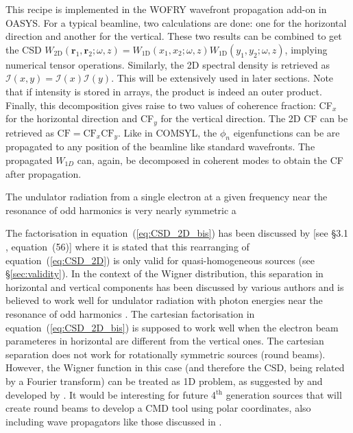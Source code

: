 \documentclass{iucr}              %
\newcommand{\inblue}[1]{{\color{blue}#1}}
\begin{document}
This recipe is implemented in the WOFRY wavefront propagation add-on in OASYS. For a typical beamline, two calculations are done: one for the horizontal direction and another for the vertical. These two results can be combined to get the CSD $W_\text{2D}(\textbf{r}_1,\textbf{r}_2;\omega,z)=W_\text{1D}(x_1,x_2;\omega,z) W_\text{1D}(y_1,y_2;\omega,z)$, implying numerical tensor operations. Similarly, the 2D spectral density is retrieved as $\mathcal{I}(x,y)=\mathcal{I}(x) \mathcal{I}(y)$. This will be extensively used in later sections. Note that if intensity is stored in arrays, the product is indeed an outer product. Finally, this decomposition gives raise to two values of coherence fraction: CF$_x$ for the horizontal direction and CF$_y$ for the vertical direction. The 2D CF can be retrieved as $\text{CF}=\text{CF}_{x} $\times$ \text{CF}_{y}$. Like in COMSYL, the $\phi_n$ eigenfunctions can be are propagated to any position of the beamline like standard wavefronts. The propagated $W_{1D}$ can, again, be decomposed in coherent modes to obtain the CF after propagation. 



The undulator radiation from a single
electron at a given frequency near the resonance of odd
harmonics is very nearly symmetric a



\inblue{
The factorisation in equation~(\ref{eq:CSD_2D_bis}) has been discussed by \citeasnoun{geloni2008} [see §3.1 , equation~(56)] where it is stated that this rearranging of equation~(\ref{eq:CSD_2D}) is only valid for quasi-homogeneous sources (see \S\ref{sec:validity}). In the context of the Wigner distribution, this separation in horizontal and vertical components has been discussed by various authors and is believed to work well for undulator radiation with photon energies near the resonance of odd
harmonics \cite{Bazarov2012,tanaka2014,nash2021}. 
The cartesian factorisation in equation~(\ref{eq:CSD_2D_bis}) is supposed to work well when the electron beam parameteres in horizontal are different from the vertical ones. The cartesian separation does not work for rotationally symmetric sources (round beams). However, the Wigner function in this case (and therefore the CSD, being related by a Fourier transform) can be treated as 1D problem, as suggested by \citeasnoun{Agarwal2000} and developed by \cite{Gasbarro2014}. It would be interesting for future 4$^\text{th}$ generation sources that will create round beams to develop a CMD tool using polar coordinates, also including wave propagators like those discussed in \cite{LiJacobsen}. 
}
\end{document}
